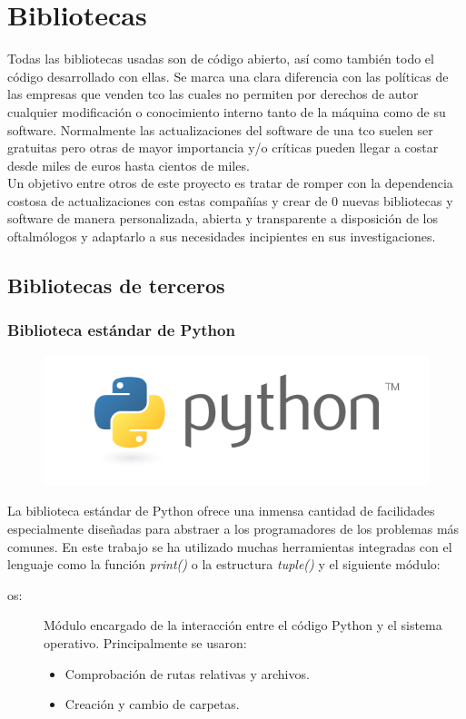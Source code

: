 \chapter{Bibliotecas}
Todas las bibliotecas usadas son de código abierto, así como también
todo el código desarrollado con ellas. Se marca una clara diferencia
con las políticas de las empresas que venden \gls{tco} las cuales no
permiten por derechos de autor cualquier modificación o conocimiento
interno tanto de la máquina como de su software. Normalmente las
actualizaciones del software de una \gls{tco} suelen ser gratuitas
pero otras de mayor importancia y/o críticas pueden llegar a costar
desde miles de euros hasta cientos de miles. \\
Un objetivo entre otros de este proyecto es tratar de romper con la
dependencia costosa de actualizaciones con estas compañías y crear de
0 nuevas bibliotecas y software de manera personalizada, abierta y
transparente a disposición de los oftalmólogos y adaptarlo a sus
necesidades incipientes en sus investigaciones.

\section{Bibliotecas de terceros}
\subsection{Biblioteca estándar de Python}
\begin{figure}[H]
  \hspace*{2.3cm}
  \includegraphics[scale=0.2]{imagenes/logos/python_logo.png}
\end{figure}
La biblioteca estándar de Python ofrece una inmensa cantidad de
facilidades especialmente diseñadas para abstraer a los programadores
de los problemas más comunes. En este trabajo se ha utilizado muchas
herramientas integradas con el lenguaje como la función \emph{print()}
o la estructura \emph{tuple()} y el siguiente módulo:
\begin{description}
\item[os:] Módulo encargado de la interacción entre el código Python y
  el sistema operativo. Principalmente se usaron:
  \begin{itemize}
  \item Comprobación de rutas relativas y archivos.
  \item Creación y cambio de carpetas.
  \end{itemize}
\end{description}


